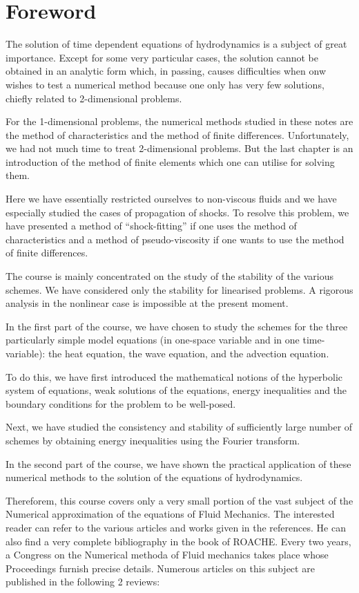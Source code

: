 \chapter{Foreword}

The solution of time dependent equations of hydrodynamics is a subject
of great importance. Except for some very particular cases, the
solution cannot be obtained in an analytic form which, in passing,
causes difficulties when onw wishes to test a numerical method because
one only has very few solutions, chiefly related to 2-dimensional
problems.

For the 1-dimensional problems, the numerical methods studied in these
notes are the method of characteristics and the method of finite
differences. Unfortunately, we had not much time to treat
2-dimensional problems. But the last chapter is an introduction of the
method of finite elements which one can utilise for solving them.

Here we have essentially restricted ourselves to non-viscous fluids
and we have especially studied the cases of propagation of shocks. To
resolve this problem, we have presented a method of ``shock-fitting''
if one uses the method of characteristics and a method of
pseudo-viscosity if one wants to use the method of finite differences.

The course is mainly concentrated on the study of the stability of the
various schemes. We have considered only the stability for linearised
problems. A rigorous analysis in the nonlinear case is impossible at
the present moment.

In the first part of the course, we have chosen to study the schemes
for the three particularly simple model equations (in one-space
variable and in one time-variable): the heat equation, the wave
equation, and the advection equation. 

To do this, we have first introduced the mathematical notions of the
hyperbolic system of equations, weak solutions of the equations, energy
inequalities and the boundary conditions for the problem to be
well-posed.

Next, we have studied the consistency and stability of sufficiently
large number of schemes by obtaining energy inequalities using the
Fourier transform.

In the second part of the course, we have shown the practical
application of these numerical methods to the solution of the
equations of hydrodynamics.

Thereforem, this course covers only a very small portion of the vast
subject of the Numerical approximation of the equations of Fluid
Mechanics. The interested reader can refer to the various articles and
works given in the references. He can also find a very complete
bibliography in the book of ROACHE. Every two years, a Congress on the
Numerical methoda of Fluid mechanics takes place whose Proceedings
furnish precise details. Numerous articles on this subject are
published in the following 2 reviews:

